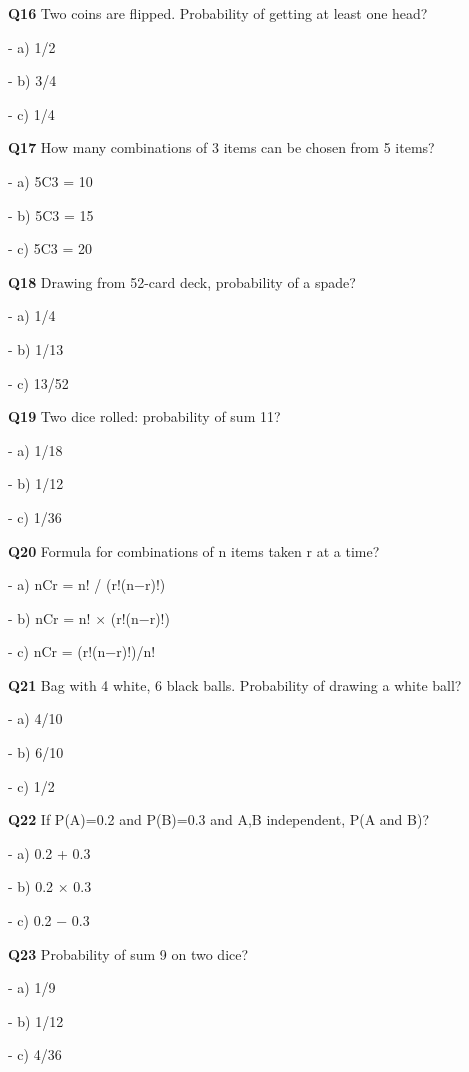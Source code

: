 \textbf{Q16} Two coins are flipped. Probability of getting at least one head?\par
\quad - a) 1/2\par
\quad - b) 3/4\par
\quad - c) 1/4\par

\textbf{Q17} How many combinations of 3 items can be chosen from 5 items?\par
\quad - a) 5C3 = 10\par
\quad - b) 5C3 = 15\par
\quad - c) 5C3 = 20\par

\textbf{Q18} Drawing from 52-card deck, probability of a spade?\par
\quad - a) 1/4\par
\quad - b) 1/13\par
\quad - c) 13/52\par

\textbf{Q19} Two dice rolled: probability of sum 11?\par
\quad - a) 1/18\par
\quad - b) 1/12\par
\quad - c) 1/36\par

\textbf{Q20} Formula for combinations of n items taken r at a time?\par
\quad - a) nCr = n! / (r!(n−r)!)\par
\quad - b) nCr = n! × (r!(n−r)!)\par
\quad - c) nCr = (r!(n−r)!)/n!\par

\textbf{Q21} Bag with 4 white, 6 black balls. Probability of drawing a white ball?\par
\quad - a) 4/10\par
\quad - b) 6/10\par
\quad - c) 1/2\par

\textbf{Q22} If P(A)=0.2 and P(B)=0.3 and A,B independent, P(A and B)?\par
\quad - a) 0.2 + 0.3\par
\quad - b) 0.2 × 0.3\par
\quad - c) 0.2 − 0.3\par

\textbf{Q23} Probability of sum 9 on two dice?\par
\quad - a) 1/9\par
\quad - b) 1/12\par
\quad - c) 4/36\par

